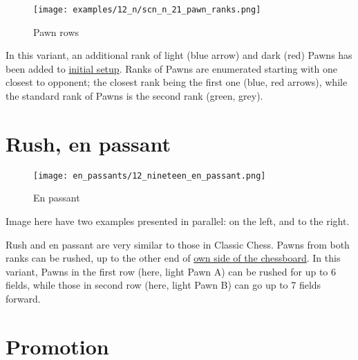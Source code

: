 \vspace*{-1.1\baselineskip}
\noindent
\begin{figure}[!h]
\texttt{[image: examples/12\_n/scn\_n\_21\_pawn\_ranks.png]}
\caption{Pawn rows}
\label{fig:scn_n_21_pawn_ranks}
\end{figure}

In this variant, an additional rank of light (blue arrow) and dark (red) Pawns has
been added to \hyperref[fig:12_nineteen]{initial setup}. Ranks of Pawns are enumerated
starting with one closest to opponent; the closest rank being the first one (blue,
red arrows), while the standard rank of Pawns is the second rank (green, grey).

\clearpage %

\section*{Rush, en passant}
\label{sec:Nineteen/Rush, en passant}

\vspace*{-0.3\baselineskip}
\noindent
\begin{wrapfigure}[14]{l}{0.4\textwidth}
\centering
\texttt{[image: en\_passants/12\_nineteen\_en\_passant.png]}
\caption{En passant}
\label{fig:12_nineteen_en_passant}
\end{wrapfigure}
Image here have two examples presented in parallel: on the left, and to the right.

Rush and en passant are very similar to those in Classic Chess. \newline
\indent
Pawns from both ranks can be rushed, up to the other end of
\hyperref[sec:Definitions/Chessboard sides, navigation]{own side of the chessboard}. \newline
\indent
In this variant, Pawns in the first row (here, light Pawn A) can be rushed for up
to 6 fields, while those in second row (here, light Pawn B) can go up to 7 fields
forward.



\vspace*{-0.9\baselineskip}
\noindent
\section*{Promotion}
\label{sec:Nineteen/Promotion}

